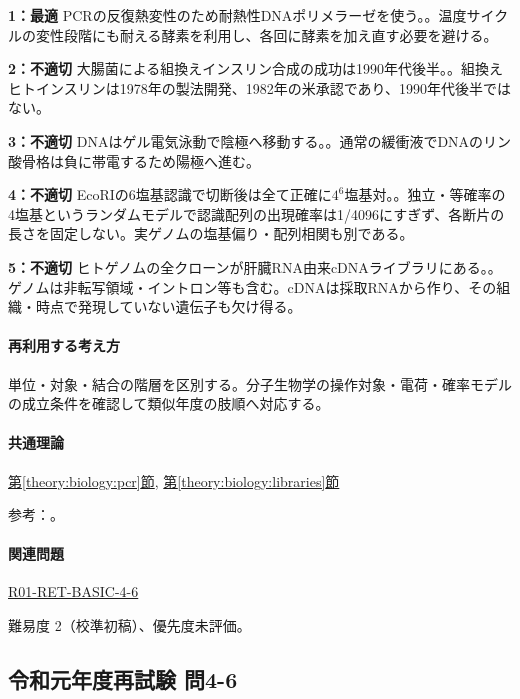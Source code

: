 \noindent\textbf{1：最適} PCRの反復熱変性のため耐熱性DNAポリメラーゼを使う。。温度サイクルの変性段階にも耐える酵素を利用し、各回に酵素を加え直す必要を避ける。\par

\noindent\textbf{2：不適切} 大腸菌による組換えインスリン合成の成功は1990年代後半。。組換えヒトインスリンは1978年の製法開発、1982年の米承認であり、1990年代後半ではない。\par

\noindent\textbf{3：不適切} DNAはゲル電気泳動で陰極へ移動する。。通常の緩衝液でDNAのリン酸骨格は負に帯電するため陽極へ進む。\par

\noindent\textbf{4：不適切} EcoRIの6塩基認識で切断後は全て正確に\(4^6\)塩基対。。独立・等確率の4塩基というランダムモデルで認識配列の出現確率は1/4096にすぎず、各断片の長さを固定しない。実ゲノムの塩基偏り・配列相関も別である。\par

\noindent\textbf{5：不適切} ヒトゲノムの全クローンが肝臓RNA由来cDNAライブラリにある。。ゲノムは非転写領域・イントロン等も含む。cDNAは採取RNAから作り、その組織・時点で発現していない遺伝子も欠け得る。\par

\paragraph{再利用する考え方} 単位・対象・結合の階層を区別する。分子生物学の操作対象・電荷・確率モデルの成立条件を確認して類似年度の肢順へ対応する。

\paragraph{共通理論} \hyperref[theory:biology:pcr]{第\ref*{theory:biology:pcr}節}, \hyperref[theory:biology:libraries]{第\ref*{theory:biology:libraries}節}

\par 参考：\cite{neb_pcr,fda_insulin,neb_ecori,nhgri_cdna}。

\paragraph{関連問題} \hyperref[q:r01-ret-basic-4-6]{R01-RET-BASIC-4-6}

\par 難易度 2（校準初稿）、優先度未評価。

\subsection{令和元年度再試験 問4-6}
\label{q:r01-ret-basic-4-6}

